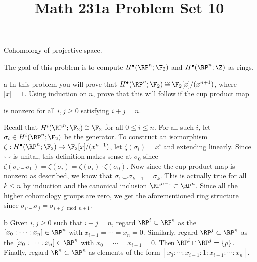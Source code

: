 \documentclass[11pt,letterpaper]{article}
\title{\textbf{Math 231a Problem Set 10}}
\begin{document}
\maketitle

\begin{problem}
    Cohomology of projective space.
\end{problem}

\begin{solution}
    The goal of this problem is to compute $H^\bullet(\RP^n; \F_2)$ and $H^\bullet(\RP^n; \Z)$ as rings.

    \begin{partproblem}{a}
        In this problem you will prove that $H^\bullet(\RP^n; \F_2)\cong \F_2[x] / (x^{n+1})$, where $|x|=1$. Using induction on $n$, prove that this will follow if the cup product map
        \begin{center}
        \end{center}
        is nonzero for all $i,j\geq 0$ satisfying $i+j=n$.
    \end{partproblem}
    \quad Recall that $H^i(\RP^n; \F_2)\cong \F_2$ for all $0\leq i \leq n$. For all such $i$, let $\sigma_i\in H^i(\RP^n; \F_2)$ be the generator. 
    To construct an isomorphism $\zeta : H^\bullet(\RP^n; \F_2) \to \F_2[x] /(x^{n+1})$, let $\zeta(\sigma_i)=x^i$ and extending linearly. Since $\smile$ is unital, this definition makes sense at $\sigma_0$ since $\zeta(\sigma_i \smile \sigma_0) = \zeta(\sigma_i)=\zeta(\sigma_i)\cdot \zeta(\sigma_0)$. Now since the cup product map is nonzero as described, we know that $\sigma_1\smile\sigma_{k-1}=\sigma_k$. This is actually true for all $k\leq n$ by induction and the canonical inclusion $\RP^{n-1}\subset \RP^n$. Since all the higher cohomology groups are zero, we get the aforementioned ring structure since $\sigma_i\smile \sigma_j=\sigma_{i+j\mod {n+1}}$.
    
    \begin{partproblem}{b}
        Given $i,j\geq 0$ such that $i+j=n$, regard $\RP^i\subset \RP^n$ as the $[x_0 : \cdots : x_n]\in \RP^n$ with $x_{i+1}=\cdots=x_n=0$. Similarly, regard $\RP^j\subset \RP^n$ as the $[x_0 : \cdots : x_n]\in \RP^n$ with $x_0=\cdots=x_{i-1}=0$. Then $\RP^i\cap \RP^j=\{p\}$. Finally, regard $\R^n\subset \RP^n$ as elements of the form $[x_0 : \cdots : x_{i-1} : 1 : x_{i+1} : \cdots : x_n]$. 


\end{partproblem}
\end{solution}
\end{document}
